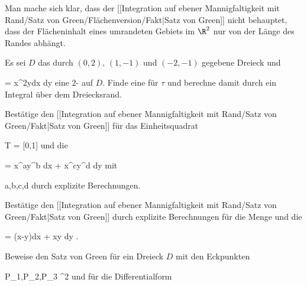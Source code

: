 {}
{

Man mache sich klar, dass der
[[Integration auf ebener Mannigfaltigkeit mit Rand/Satz von Green/Flächenversion/Fakt|Satz von Green]]
nicht behauptet, dass der Flächeninhalt eines umrandeten Gebiets im $\R^2$ nur von der Länge des Randes abhängt.

}
{} {}

{}
{

Es sei $D$ das durch
$(0,2),\, (1,-1)$ und $(-2,-1)$
gegebene Dreieck und

\mavergleichskette
{\vergleichskette
{ \tau
}
{ = }{ x^2ydx \wedge dy
}
{  }{
}
{    }{
}
{   }{
}
}
{}{}{}
eine
$2$- auf $D$. Finde eine
für $\tau$ und berechne damit
 durch ein Integral über dem Dreiecksrand.

}
{} {}

{}
{

Bestätige
den [[Integration auf ebener Mannigfaltigkeit mit Rand/Satz von Green/Fakt|Satz von Green]]
für das Einheitsquadrat

\mavergleichskette
{\vergleichskette
{ T
}
{ = }{ [0,1] \times [0,1]
}
{  }{
}
{    }{
}
{   }{
}
}
{}{}{}
und die

\mavergleichskettedisp
{\vergleichskette
{ \omega
}
{ =} { x^ay^b dx + x^cy^d dy
}
{ } {
}
{ } {
}
{ } {
}
}
{}{}{}
mit

\mavergleichskette
{\vergleichskette
{ a,b,c,d
}
{ \in }{ \N
}
{  }{
}
{    }{
}
{   }{
}
}
{}{}{}
durch explizite Berechnungen.

}
{} {}

{}
{

Bestätige
den [[Integration auf ebener Mannigfaltigkeit mit Rand/Satz von Green/Fakt|Satz von Green]]
durch explizite Berechnungen für die Menge
 {} {}
und die

\mavergleichskette
{\vergleichskette
{ \omega
}
{ = }{(x-y)dx + xy dy
}
{  }{
}
{    }{
}
{   }{
}
}
{}{}{.}

}
{} {}

{}
{

Beweise den Satz von Green für ein Dreieck $D$ mit den Eckpunkten

\mavergleichskette
{\vergleichskette
{ P_1,P_2,P_3
}
{ \in }{ \R^2
}
{  }{
}
{    }{
}
{   }{
}
}
{}{}{}
und für die Differentialform

}
{} {}

